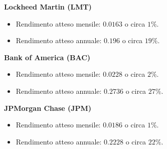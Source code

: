 \textbf{Lockheed Martin (LMT)}

\begin{itemize}
    \item Rendimento atteso mensile: $0.0163$ o circa $1\%$.
    \item Rendimento atteso annuale: $0.196$ o circa $19\%$.
\end{itemize}

\textbf{Bank of America (BAC)}

\begin{itemize}
    \item Rendimento atteso mensile: $0.0228$ o circa $2\%$.
    \item Rendimento atteso annuale: $0.2736$ o circa $27\%$.
\end{itemize}

\textbf{JPMorgan Chase (JPM)}

\begin{itemize}
    \item Rendimento atteso mensile: $0.0186$ o circa $1\%$.
    \item Rendimento atteso annuale: $0.2228$ o circa $22\%$.
\end{itemize}